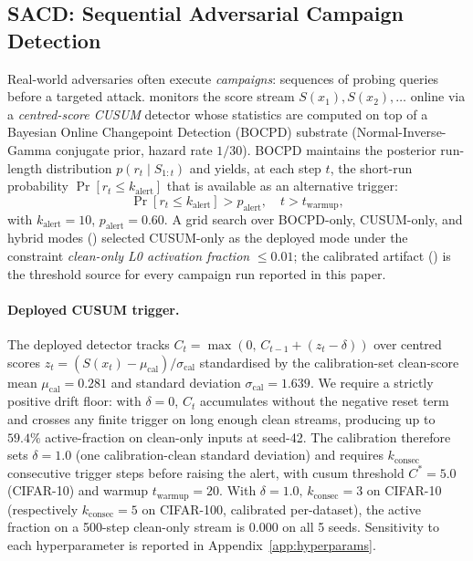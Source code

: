 \subsection{SACD: Sequential Adversarial Campaign Detection}
\label{sec:sacd}

Real-world adversaries often execute \emph{campaigns}: sequences of probing
queries before a targeted attack.
\sacd monitors the score stream $S(x_1), S(x_2), \ldots$ online via a
\emph{centred-score CUSUM} detector whose statistics are computed on top
of a Bayesian Online Changepoint Detection (BOCPD)
\cite{adams2007bayesian} substrate (Normal-Inverse-Gamma conjugate prior,
hazard rate $1/30$). BOCPD maintains the posterior run-length
distribution $p(r_t \mid S_{1:t})$ and yields, at each step $t$, the
short-run probability
$\Pr[r_t \leq k_\text{alert}]$ that is available as an alternative
trigger:
\begin{equation}
  \Pr[r_t \leq k_\text{alert}] > p_\text{alert}, \quad t > t_\text{warmup},
  \label{eq:l0_trigger}
\end{equation}
with $k_\text{alert}=10$, $p_\text{alert}=0.60$.
A grid search over BOCPD-only, CUSUM-only, and hybrid modes
() selected CUSUM-only as
the deployed mode under the constraint
\textit{clean-only L0 activation fraction} $\leq 0.01$; the calibrated
artifact () is the threshold source for
every campaign run reported in this paper.

\paragraph{Deployed CUSUM trigger.}
The deployed detector tracks
$C_t = \max(0,\, C_{t-1} + (z_t - \delta))$ over centred scores
$z_t = (S(x_t) - \mu_\text{cal}) / \sigma_\text{cal}$ standardised by the
calibration-set clean-score mean $\mu_\text{cal}=0.281$ and standard
deviation $\sigma_\text{cal}=1.639$. We require a strictly positive drift
floor: with $\delta = 0$, $C_t$ accumulates without the negative reset
term and crosses any finite trigger on long enough clean streams,
producing up to $59.4\%$ active-fraction on clean-only inputs at seed-42.
The calibration therefore sets $\delta = \mathbf{1.0}$ (one calibration-clean
standard deviation) and requires
$k_\text{consec}$ consecutive trigger steps before raising the alert,
with cusum threshold $C^* = 5.0$ (CIFAR-10) and warmup
$t_\text{warmup}=20$. With $\delta=1.0,\, k_\text{consec}=3$ on CIFAR-10
(respectively $k_\text{consec}=5$ on CIFAR-100, calibrated per-dataset),
the active fraction on a 500-step clean-only stream is $0.000$ on all 5
seeds. Sensitivity to each hyperparameter is reported in
Appendix~\ref{app:hyperparams}.

